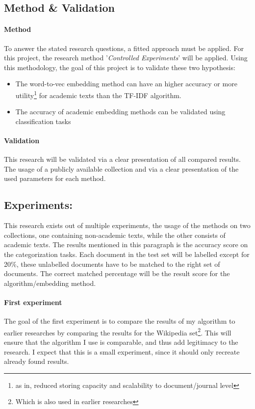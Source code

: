 \documentclass[10pt,a4paper]{article}
\begin{document}
\subsection{Method \& Validation}
\paragraph{Method} To answer the stated research questions, a fitted approach must be applied. For this project, the research method '\textit{Controlled Experiments}' will be applied. Using this methodology, the goal of this project is to validate these two hypothesis:
\begin{itemize}
\item{The word-to-vec embedding method can have an higher accuracy or more utility\footnote{as in, reduced storing capacity and scalability to document/journal level} for academic texts than the TF-IDF algorithm.}
\item{The accuracy of academic embedding methods can be validated using classification tasks}
\end{itemize}
\paragraph{Validation} This research will be validated via a clear presentation of all compared results. The usage of a publicly available collection and via a clear presentation of the used parameters for each method.

\subsection{Experiments:}
This research exists out of multiple experiments, the usage of the methods on two collections, one containing non-academic texts, while the other consists of academic texts. The results mentioned in this paragraph is the accuracy score on the categorization tasks. Each document in the test set will be labelled except for 20\%, these unlabelled documents have to be matched to the right set of documents. The correct matched percentage will be the result score for the algorithm/embedding method.\\
\paragraph{First experiment}The goal of the first experiment is to compare the results of my algorithm to earlier researches by comparing the results for the Wikipedia set\footnote{Which is also used in earlier researches}. This will ensure that the algorithm I use is comparable, and thus add legitimacy to the research. I expect that this is a small experiment, since it should only recreate already found results.\\
\end{document}
